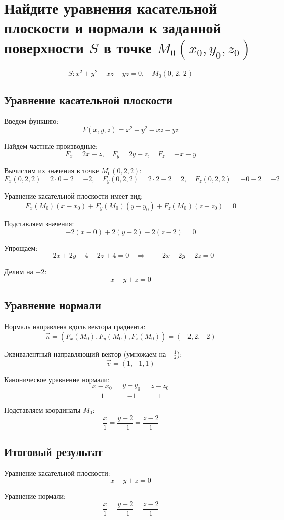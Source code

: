 \section{Найдите уравнения касательной плоскости и нормали к заданной
поверхности $S$ в точке $M_0(x_0, y_0, z_0)$}

\[
S: x^2 + y^2 - xz - yz = 0, \quad M_0(0,\, 2,\, 2)
\]

\subsection{Уравнение касательной плоскости}

Введем функцию:
\[
F(x, y, z) = x^2 + y^2 - xz - yz
\]

Найдем частные производные:
\[
F_x = 2x - z, \quad F_y = 2y - z, \quad F_z = -x - y
\]

Вычислим их значения в точке \(M_0(0, 2, 2)\):
\[
F_x(0, 2, 2) = 2 \cdot 0 - 2 = -2, \quad 
F_y(0, 2, 2) = 2 \cdot 2 - 2 = 2, \quad 
F_z(0, 2, 2) = -0 - 2 = -2
\]

Уравнение касательной плоскости имеет вид:
\[
F_x(M_0)(x - x_0) + F_y(M_0)(y - y_0) + F_z(M_0)(z - z_0) = 0
\]

Подставляем значения:
\[
-2(x - 0) + 2(y - 2) - 2(z - 2) = 0
\]

Упрощаем:
\[
-2x + 2y - 4 - 2z + 4 = 0 \quad \Rightarrow \quad -2x + 2y - 2z = 0
\]

Делим на \(-2\):
\[
x - y + z = 0
\]

\subsection{Уравнение нормали}

Нормаль направлена вдоль вектора градиента:
\[
\vec{n} = (F_x(M_0), F_y(M_0), F_z(M_0)) = (-2, 2, -2)
\]

Эквивалентный направляющий вектор (умножаем на \(-\frac{1}{2}\)):
\[
\vec{v} = (1, -1, 1)
\]

Каноническое уравнение нормали:
\[
\frac{x - x_0}{1} = \frac{y - y_0}{-1} = \frac{z - z_0}{1}
\]

Подставляем координаты \(M_0\):
\[
\frac{x}{1} = \frac{y - 2}{-1} = \frac{z - 2}{1}
\]

\subsection{Итоговый результат}

Уравнение касательной плоскости:
\[
\boxed{x - y + z = 0}
\]

Уравнение нормали:
\[
\boxed{\frac{x}{1} = \frac{y - 2}{-1} = \frac{z - 2}{1}}
\]
